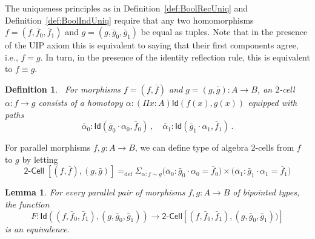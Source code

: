 \documentclass[reqno,10pt,a4paper,oneside]{amsart}
\newcommand{\co}{\colon}
\newcommand{\sm}[1]{\Sigma_{#1}}
\newcommand{\defeq}{=_{\mathrm{def}}}
\newcommand{\Id}{\mathsf{Id}}
\newcommand{\BoolCell}{\mathsf{2}\text{-}\mathsf{Cell}}
\numberwithin{equation}{section}
\theoremstyle{mythm}
\newtheorem{lemma}[theorem]{Lemma}
\theoremstyle{mydef}
\newtheorem{definition}[theorem]{Definition}
\theoremstyle{myrmk}
\begin{document}
The uniqueness principles as in Definition~\ref{def:BoolRecUniq} and Definition~\ref{def:BoolIndUniq} require that
any two homomorphisms $f = (f,\bar{f}_0,\bar{f}_1)$ and $g = (g,\bar{g}_0,\bar{g}_1)$ be equal as tuples.
Note that in the presence of the UIP axiom this is equivalent to saying that their first components agree, i.e., $f = g$.
In turn, in the presence of the identity reflection rule, this is equivalent to $f \equiv g$.


\begin{definition}\ \label{def:BoolCell} For morphisms $f = (f, \bar{f})$ and $g =  (g, \bar{g}) : A \to B$, an \emph{$2$-cell} $\alpha \co f \to g$ consists of a homotopy $\alpha \co (\Pi x : A)  \Id( f(x), g(x))$
equipped with paths
\[
\bar{\alpha}_0 \co \Id( \bar{g}_0 \cdot \alpha_0, \bar{f}_0)  \, , \quad 
\bar{\alpha}_1 \co \Id( \bar{g}_1 \cdot \alpha_1, \bar{f}_1 ) \, .
\]
\end{definition}


For parallel morphisms $f, g \co A \to B$, we can define type of algebra 2-cells from $f$ to $g$ by letting
\[
 \BoolCell \;  [ (f,\bar{f}), (g, \bar{g})]     \defeq   \sm{ \alpha \co f \sim g}   \big(  
 \bar{\alpha}_0 \co \bar{g}_0 \cdot \alpha_0 = \bar{f}_0 \big) \times 
\big( \bar{\alpha}_1 \co \bar{g}_1 \cdot \alpha_1 = \bar{f}_1 \big)
\]




\begin{lemma} \label{BoolHomSpace}
\label{BoolHomSpace}
For every parallel pair of morphisms $f, g \co A \to B$ of bipointed types, the function
\[
F \co \Id( (f, \bar{f}_0, \bar{f}_1), (g, \bar{g}_0, \bar{g}_1) ) \to \BoolCell[ (f, \bar{f}_0, \bar{f}_1), (g, \bar{g}_0, \bar{g}_1) ) ]
\]
is an equivalence.
\end{lemma}
\end{document}
